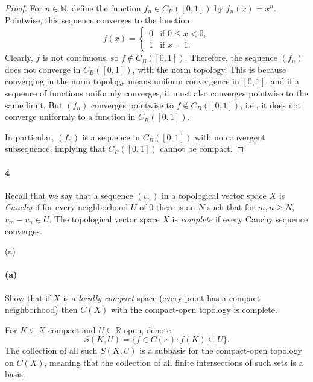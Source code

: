 \documentclass[12pt]{article}
\newlength{\myparskip}
\newenvironment{fullbox}{\begin{lrbox}{\savefullbox}\begin{minipage}{\dimexpr\textwidth-2\fboxsep\relax}\setlength{\parskip}{\myparskip}}{\end{minipage}\end{lrbox}\framebox[\textwidth]{\usebox{\savefullbox}}}
\newenvironment{pbox}[1][]{\begin{fullbox}\ifx#1\empty\else\paragraph{#1}\fi}{\end{fullbox}}
\newcommand{\N}{\mathbb{N}}
\newcommand{\R}{\mathbb{R}}
\newcommand{\<}{\langle}
\renewcommand{\>}{\rangle}
\begin{document}
\begin{proof}
    For $n \in \N$, define the function $f_n \in C_B([0, 1])$ by $f_n(x) = x^n$. Pointwise, this sequence converges to the function
    \[
        f(x) = \begin{cases}
            0 &\text{if } 0 \leq x < 0, \\
            1 &\text{if } x = 1.
        \end{cases}
    \]
    Clearly, $f$ is not continuous, so $f \notin C_B([0, 1])$. Therefore, the sequence $(f_n)$ does not converge in $C_B([0, 1])$, with the norm topology. This is because converging in the norm topology means uniform convergence in $[0, 1]$, and if a sequence of functions uniformly converges, it must also converges pointwise to the same limit. But $(f_n)$ converges pointwise to $f \notin C_B([0, 1])$, i.e., it does not converge uniformly to a function in $C_B([0, 1])$.

    In particular, $(f_n)$ is a sequence in $C_B([0, 1])$ with no convergent subsequence, implying that $C_B([0, 1])$ cannot be compact.

\end{proof}

\newpage
\begin{pbox}[4]
    Recall that we say that a sequence $(v_n)$ in a topological vector space $X$ is \emph{Cauchy} if for every neighborhood $U$ of $0$ there is an $N$ such that for $m,n \geq N$, $v_m-v_n \in U$.  The topological vector space $X$ is \emph{complete} if every Cauchy sequence converges.
\end{pbox}

\begin{pbox}[(a)]
    Show that if $X$ is a \emph{locally compact} space (every point has a compact neighborhood) then $C(X)$ with the compact-open topology is complete.
\end{pbox}

For $K \subseteq X$ compact and $U \subseteq \R$ open, denote
\[
    S(K, U) = \{f \in C(x) : f(K) \subseteq U\}.
\]
The collection of all such $S(K, U)$ is a subbasis for the compact-open topology on $C(X)$, meaning that the collection of all finite intersections of such sets is a basis.
\end{document}

